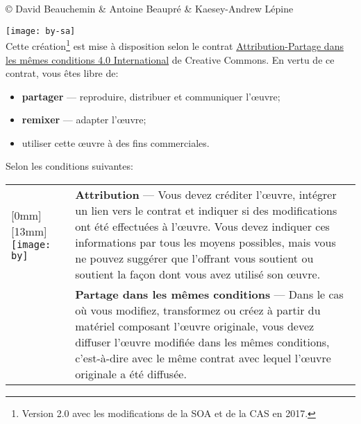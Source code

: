 \small
{\copyright} {\the\year} David Beauchemin \& Antoine Beaupré \& Kaesey-Andrew Lépine \\

\vspace{\baselineskip}

\texttt{[image: by-sa]}\\%
Cette création\footnote{Version 2.0 avec les modifications de la SOA et de la CAS en 2017.} est mise à disposition selon le contrat
\href{http://creativecommons.org/licenses/by-sa/4.0/deed.fr}{%
  Attribution-Partage dans les mêmes conditions 4.0 International} de
Creative Commons. En vertu de ce contrat, vous êtes libre de:
\begin{itemize}
\item \textbf{partager} --- reproduire, distribuer et communiquer
  l'{\oe}uvre;
\item \textbf{remixer} --- adapter l'{\oe}uvre;
\item utiliser cette {\oe}uvre à des fins commerciales.
\end{itemize}
Selon les conditions suivantes:

\begin{tabularx}{\linewidth}{@{}lX@{}}
  \raisebox{-9mm}[0mm][13mm]{%
    \texttt{[image: by]}} &
  \textbf{Attribution} --- Vous devez créditer l'{\oe}uvre, intégrer
  un lien vers le contrat et indiquer si des modifications ont été
  effectuées à l'{\oe}uvre. Vous devez indiquer ces informations par
  tous les moyens possibles, mais vous ne pouvez suggérer que
  l'offrant vous soutient ou soutient la façon dont vous avez utilisé
  son {\oe}uvre. \\
  \raisebox{-9mm}{\texttt{[image: sa]}}
  & \textbf{Partage dans les mêmes conditions} --- Dans le cas où vous
  modifiez, transformez ou créez à partir du matériel composant
  l'{\oe}uvre originale, vous devez diffuser l'{\oe}uvre modifiée dans
  les mêmes conditions, c'est-à-dire avec le même contrat avec lequel
  l'{\oe}uvre originale a été diffusée.
\end{tabularx}
